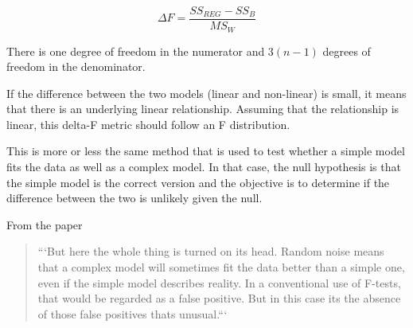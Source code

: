 \documentclass[12pt, a4paper, oneside]{article}\usepackage[]{graphicx}\usepackage[]{color}
\begin{document}
\begin{equation}
\Delta F = \frac{SS_{REG} - SS_B}{MS_W}
\end{equation}

There is one degree of freedom in the numerator and $3(n-1)$ degrees of freedom in the denominator. 

If the difference between the two models (linear and non-linear) is small, it means that there is an underlying linear relationship. Assuming that the relationship is linear, this delta-F metric should follow an F distribution. 

This is more or less the same method that is used to test whether a simple model fits the data as well as a complex model. In that case, the null hypothesis is that the simple model is the correct version and the objective is to determine if the difference between the two is unlikely given the null. 

From the paper

\begin{quotation}
```But here the whole thing is turned on its head. Random noise means that a complex model will sometimes fit the data better than a simple one, even if the simple model describes reality. In a conventional use of F-tests, that would be regarded as a false positive. But in this case its the absence of those false positives thats unusual.```
\end{quotation}
\end{document}
